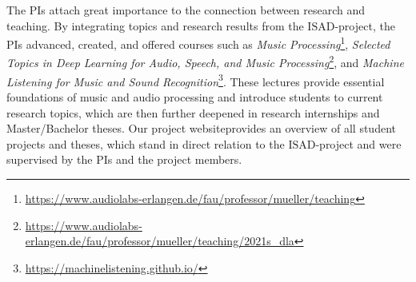 \documentclass[11pt,a4paper]{article}
\def\PN{\mathrm{ISAD}}
\newenvironment{itemizePacked}{
\begin{itemize}
  \setlength{\itemsep}{1pt}
  \setlength{\parskip}{0pt}
  \setlength{\parsep}{0pt}
  \renewcommand{\labelitemi}{$\bullet$}
}{\end{itemize}}
\newcommand{\meinard}[1]{{\color{red} #1}}
\newcommand{\jakob}[1]{{\color{magenta} #1}}
\theoremstyle{plain} \newtheorem{define}{Definition}[section]
\begin{document}
{%

%
%
The PIs attach great importance to the connection between research and teaching. By integrating topics and research results from the $\PN$-project, the PIs advanced, created, and offered courses such as \emph{Music Processing}\footnote{\url{https://www.audiolabs-erlangen.de/fau/professor/mueller/teaching}}, \emph{Selected Topics in Deep Learning for Audio, Speech, and Music Processing}\footnote{\url{https://www.audiolabs-erlangen.de/fau/professor/mueller/teaching/2021s_dla}}, and \emph{Machine Listening for Music and Sound Recognition}\footnote{\url{https://machinelistening.github.io/}}. These lectures
provide essential foundations of music and audio processing and introduce students to current research topics, which are then further deepened in research internships and Master/Bachelor theses. 
Our project website\footnotemark[\ref{pro_res_url}] provides an overview of all student projects and theses, which stand in direct relation to the $\PN$-project and were supervised by the PIs and the project members.






}
\end{document}
